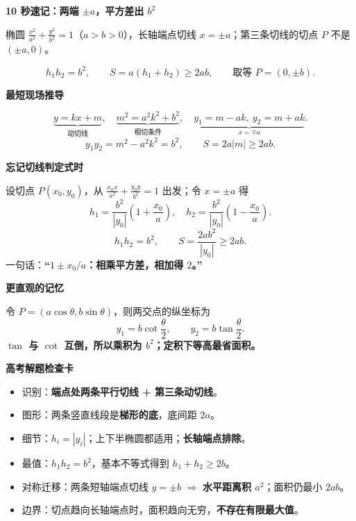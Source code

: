 \begin{summarybox}
\textbf{\textcolor{CSummary}{10 秒速记：两端 $\pm a$，平方差出 $b^2$}}

椭圆 $\frac{x^2}{a^2}+\frac{y^2}{b^2}=1$（$a>b>0$），长轴端点切线 $x=\pm a$；第三条切线的切点 $P$ 不是 $(\pm a,0)$。

\[
\boxed{h_1h_2=b^2},\qquad
\boxed{S=a(h_1+h_2)\ge2ab},\qquad
\boxed{\text{取等 }P=(0,\pm b)}.
\]

\medskip
\textbf{\textcolor{CSummary}{最短现场推导}}

\[
\underbrace{y=kx+m}_{\text{动切线}},\quad
\underbrace{m^2=a^2k^2+b^2}_{\text{相切条件}},\quad
\underbrace{y_1=m-ak,\ y_2=m+ak}_{x=\mp a}.
\]
\[
\boxed{y_1y_2=m^2-a^2k^2=b^2},\qquad
\boxed{S=2a|m|\ge2ab}.
\]

\medskip
\textbf{\textcolor{CSummary}{忘记切线判定式时}}

设切点 $P(x_0,y_0)$，从 $\frac{x_0x}{a^2}+\frac{y_0y}{b^2}=1$ 出发；令 $x=\pm a$ 得
\[
h_1=\frac{b^2}{|y_0|}\left(1+\frac{x_0}{a}\right),\quad
h_2=\frac{b^2}{|y_0|}\left(1-\frac{x_0}{a}\right).
\]
\[
h_1h_2=b^2,\qquad
S=\frac{2ab^2}{|y_0|}\ge2ab.
\]
一句话：\textbf{“$1\pm x_0/a$：相乘平方差，相加得 $2$。”}

\medskip
\textbf{\textcolor{CSummary}{更直观的记忆}}

令 $P=(a\cos\theta,b\sin\theta)$，则两交点的纵坐标为
\[
y_1=b\cot\frac\theta2,\qquad
y_2=b\tan\frac\theta2.
\]
\textbf{$\tan$ 与 $\cot$ 互倒，所以乘积为 $b^2$；定积下等高最省面积。}

\medskip
\textbf{\textcolor{CSummary}{高考解题检查卡}}
\begin{itemize}[leftmargin=*,itemsep=0.3em,topsep=0.2em]
\item 识别：\textbf{端点处两条平行切线 + 第三条动切线}。
\item 图形：两条竖直线段是\textbf{梯形的底}，底间距 $2a$。
\item 细节：$h_i=|y_i|$；上下半椭圆都适用；\textbf{长轴端点排除}。
\item 最值：$h_1h_2=b^2$，基本不等式得到 $h_1+h_2\ge2b$。
\item 对称迁移：两条短轴端点切线 $y=\pm b$ $\Rightarrow$ \textbf{水平距离积 $a^2$}；面积仍最小 $2ab$。
\item 边界：切点趋向长轴端点时，面积趋向无穷，\textbf{不存在有限最大值}。
\end{itemize}
\end{summarybox}
